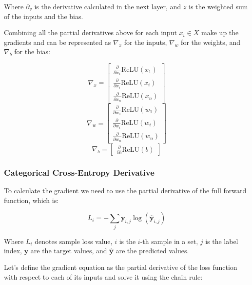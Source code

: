 \documentclass[a4paper]{report}
\newcommand{\vect}[1]{\bm{#1}}
\newcommand{\relu}{\text{ReLU}}
\begin{document}
Where $\partial_v$ is the derivative calculated in the next layer, and $z$ is the weighted sum of the inputs and the bias.

Combining all the partial derivatives above for each input $x_i \in X$ make up the gradients and can be represented as $\nabla_x$ for the inputs, $\nabla_w$ for the weights, and $\nabla_b$ for the bias:

\begin{equation*}
    \nabla_x = 
    \begin{bmatrix}
        \frac{\partial}{\partial x_1}\relu(x_1)\\
        \frac{\partial}{\partial x_i}\relu(x_i)\\
        \frac{\partial}{\partial x_n}\relu(x_n)
    \end{bmatrix}
\end{equation*}
\begin{equation*}
    \nabla_w = 
    \begin{bmatrix}
        \frac{\partial}{\partial w_1}\relu(w_1)\\
        \frac{\partial}{\partial w_i}\relu(w_i)\\
        \frac{\partial}{\partial w_n}\relu(w_n)
    \end{bmatrix}
\end{equation*}
\begin{equation*}
    \nabla_b = 
    \begin{bmatrix}
        \frac{\partial}{\partial b}\relu(b)
    \end{bmatrix}
\end{equation*}

\subsubsection*{Categorical Cross-Entropy Derivative}

To calculate the gradient we need to use the partial derivative of the full forward function, which is:

\begin{equation*}
    L_i = -\sum_{j} \vect{y}_{i,j} \log(\vect{\hat{y}}_{i,j})
\end{equation*}

Where $L_i$ denotes sample loss value, $i$ is the $i$-th sample in a set, $j$ is the label index, $\vect{y}$ are the target values, and $\vect{\hat{y}}$ are the predicted values.

Let's define the gradient equation as the partial derivative of the loss function with respect to each of its inputs and solve it using the chain rule:
\end{document}
